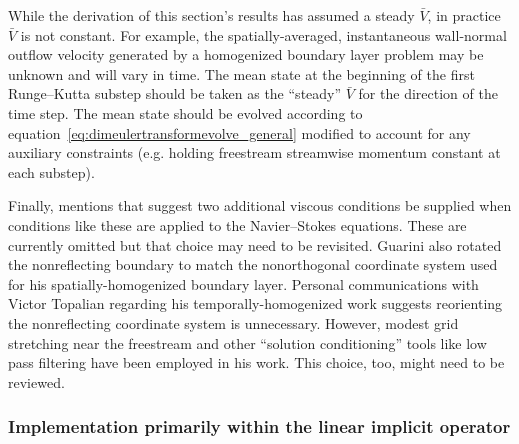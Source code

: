 \documentclass[letterpaper,11pt,nointlimits,reqno,draft]{amsbook}
\begin{document}
While the derivation of this section's results has assumed a steady $\bar{V}$,
in practice $\bar{V}$ is not constant.  For example, the spatially-averaged,
instantaneous wall-normal outflow velocity generated by a homogenized boundary
layer problem may be unknown and will vary in time.  The mean state at the
beginning of the first Runge--Kutta substep should be taken as the ``steady''
$\bar{V}$ for the direction of the time step.  The mean state should be evolved
according to equation~\eqref{eq:dimeulertransformevolve_general} modified to
account for any auxiliary constraints (e.g. holding freestream streamwise
momentum constant at each substep).

Finally, \citet{Guarini1998} mentions that \citet{Poinsot1992Boundary}
suggest two additional viscous conditions be supplied when conditions like
these are applied to the Navier--Stokes equations.  These are currently omitted
but that choice may need to be revisited.  Guarini also rotated the
nonreflecting boundary to match the nonorthogonal coordinate system used for
his spatially-homogenized boundary layer.  Personal communications with Victor
Topalian regarding his temporally-homogenized work suggests reorienting the
nonreflecting coordinate system is unnecessary.  However, modest grid
stretching near the freestream and other ``solution conditioning'' tools like
low pass filtering have been employed in his work.  This choice, too, might
need to be reviewed.

\subsubsection{Implementation primarily within the linear implicit operator}
\end{document}
